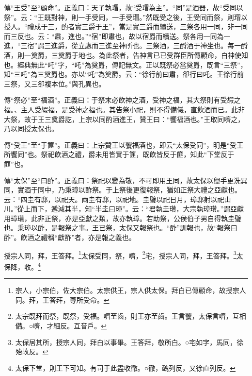 {\noindent\zhuan{}\fzbyks 傳“王受”至“顧命”。正義曰：天子執瑁，故“受瑁為主”。“同”是酒器，故“受同以祭”。云：“王既對神，則一手受同，一手受瑁。”然既受之後，王受同而祭，則瑁以授人。“禮成于三，酌者實三爵于王”，當是實三爵而續送，三祭各用一同，非一同而三反也。云：“肅，進也。”“宿”即肅也，故以宿爵而續送。祭各用一同為一進，“三宿”謂三進爵，從立處而三進至神所也。三祭酒，三酹酒于神坐也。每一酹酒，則一奠爵，三奠爵于地也。為此祭者，告神言已已受群臣所傳顧命，白神使知也。經典無此“吒”字，“吒”為奠爵，傳記無文。正以既祭必當奠爵，既言“三祭”，知“三吒”為三奠爵也。亦以“吒”為奠爵。云：“徐行前曰肅，卻行曰吒。王徐行前三祭，又三卻複本位。”與孔異也。 \par}

{\noindent\zhuan{}\fzbyks 傳“祭必”至“福酒”。正義曰：于祭末必飲神之酒，受神之福，其大祭則有受嘏之福。、主人受嘏福，是受神之福也。其告祭小祀，則不得備儀，直飲酒而已。此非大祭，故于王三奠爵訖，上宗以同酌酒進王，贊王曰：“饗福酒也。”王取同嚌之，乃以同授太保也。 \par}

{\noindent\zhuan{}\fzbyks 傳“受王”至“于篚”。正義曰：上宗贊王以饗福酒也，即云“太保受同”，明是“受王所饗同”也。祭祀飲酒之禮，爵未用皆實于篚，既飲皆反于篚，知此“下堂反于篚”也。 \par}

{\noindent\zhuan{}\fzbyks 傳“太保”至“曰酢”。正義曰：祭祀以變為敬，不可即用王同，故太保以盥手更洗異同，實酒于同中，乃秉璋以酢祭。于上祭後更復報祭，猶如正祭大禮之亞獻也。云：“四圭有邸，以祀天。兩圭有邸，以祀地。圭璧以祀日月，璋邸射以祀山川。”從上而下，遞減其半，知“半圭曰璋”。云：“君執圭瓚，大宗執璋瓚。”謂亞獻用璋瓚，此非正祭，亦是亞獻之類，故亦執璋。若助祭，公侯伯子男自得執圭璧也。秉璋以酢，是報祭之事。王已祭，太保又報祭也。“酢”訓報也，故“報祭曰酢”。飲酒之禮稱“獻酢”者，亦是報之義也。 \par}

授宗人同，拜，王答拜。\footnote{宗人，小宗伯，佐大宗伯。太宗供王，宗人供太保。拜白已傳顧命，故授宗人同。拜，王答拜，尊所受命。}太保受同，祭，嚌，\footnote{太宗既拜而祭，既祭，受福。嚌至齒，則王亦至齒。王言饗，太保言嚌，互相備。○嚌，才細反。互音戶。}宅，授宗人同，拜，王答拜。\footnote{太保居其所，授宗人同，拜白以事畢。王答拜，敬所白。○宅如字，馬同，徐殆故反。}太保降，收。\footnote{太保下堂，則王下可知。有司于此盡收徹。○徹，醜列反，又徐直列反。}

